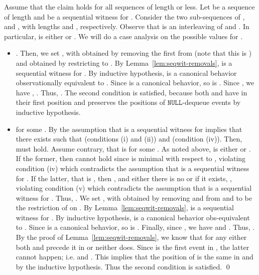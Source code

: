 \documentclass{LMCS}
\newcommand{\NULL}{\ensuremath{\mathtt{NULL}}}
\begin{document}
Assume that the claim holds for all sequences of length  or less.
Let  be a sequence of length  and  be a sequential witness for .
Consider the two sub-sequences of ,  and , with lengths  and , respectively.
Observe that  is an interleaving of  and .
In particular,  is either  or .
We will do a case analysis on the possible values for .
\begin{itemize}
\item .
Then, we set , with  obtained by removing the first  from  (note that this is ) and  obtained by restricting  to .
By Lemma~\ref{lem:seqwit-removals},  is a sequential witness for .
By inductive hypothesis,  is a canonical behavior observationally equivalent to .
Since  is a canonical behavior, so is .
Since , we have , .
Thus, .
The second condition is satisfied, because both  and  have  in their first position and  preserves the positions of {\NULL}-dequeue events by inductive hypothesis.
\item  for some .
By the assumption that  is a sequential witness for  implies that there exists  such that  (conditions (i) and (ii)) and  (condition (iv)).
Then,  must hold.
Assume contrary, that is  for some .
As noted above,  is either  or .
If the former, then  cannot hold since  is minimal with respect to , violating condition (iv) which contradicts the assumption that  is a sequential witness for .
If the latter, that is , then , and either there is no  or if it exists, , violating condition (v) which contradicts the assumption that  is a sequential witness for .
Thus, . 
We set , with  obtained by removing  and  from  and  to be the restriction of  on .
By Lemma~\ref{lem:seqwit-removals},  is a sequential witness for .
By inductive hypothesis,  is a canonical behavior obs-equivalent to .
Since  is a canonical behavior, so is .
Finally, since , we have  and . 
Thus, .
By the proof of Lemma~\ref{lem:seqwit-removals}, we know that for any  either both  and  precede it in  or neither does.
Since  is the first event in , the latter cannot happen; i.e.  and .
This implies that the position of  is the same in  and  by the inductive hypothesis.
Thus the second condition is satisfied. 
\qed
\end{itemize}
\end{document}
